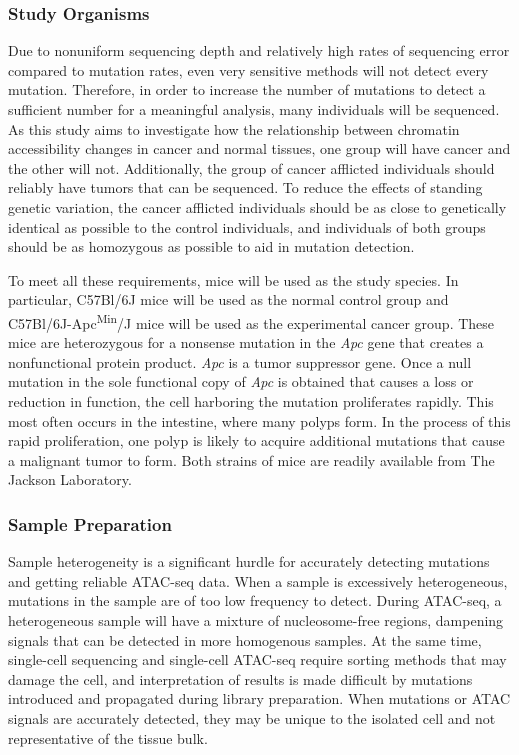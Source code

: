 \subsubsection{Study Organisms}
Due to nonuniform sequencing depth and relatively high rates of sequencing error compared to mutation rates, even very sensitive methods will not detect every mutation. Therefore, in order to increase the number of mutations to detect a sufficient number for a meaningful analysis, many individuals will be sequenced. As this study aims to investigate how the relationship between chromatin accessibility changes in cancer and normal tissues, one group will have cancer and the other will not.
Additionally, the group of cancer afflicted individuals should reliably have tumors that can be sequenced. To reduce the effects of standing genetic variation, the cancer afflicted individuals should be as close to genetically identical as possible to the control individuals, and individuals of both groups should be as homozygous as possible to aid in mutation detection.

To meet all these requirements, mice will be used as the study species. In particular, C57Bl/6J mice will be used as the normal control group and C57Bl/6J-Apc\textsuperscript{Min}/J mice will be used as the experimental cancer group. These mice are heterozygous for a nonsense mutation in the \textit{Apc} gene that creates a nonfunctional protein product. \textit{Apc} is a tumor suppressor gene. Once a null mutation in the sole functional copy of \textit{Apc} is obtained that causes a loss or reduction in function, the cell harboring the mutation proliferates rapidly. This most often occurs in the intestine, where many polyps form. In the process of this rapid proliferation, one polyp is likely to acquire additional mutations that cause a malignant tumor to form. Both strains of mice are readily available from The Jackson Laboratory.

\subsubsection{Sample Preparation}

Sample heterogeneity is a significant hurdle for accurately detecting mutations and getting reliable ATAC-seq data. When a sample is excessively heterogeneous, mutations in the sample are of too low frequency to detect. During ATAC-seq, a heterogeneous sample will have a mixture of nucleosome-free regions, dampening signals that can be detected in more homogenous samples. At the same time, single-cell sequencing and single-cell ATAC-seq require sorting methods that may damage the cell, and interpretation of results is made difficult by mutations introduced and propagated during library preparation. When mutations or ATAC signals are accurately detected, they may be unique to the isolated cell and not representative of the tissue bulk.

